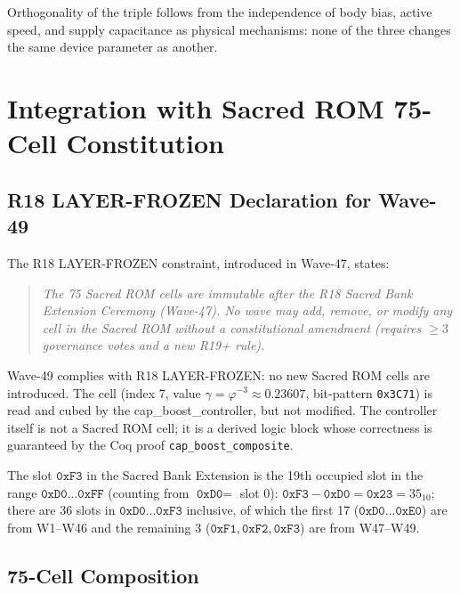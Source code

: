 \documentclass[12pt,a4paper]{report}
\theoremstyle{plain}
\theoremstyle{definition}
\theoremstyle{remark}
\newcommand{\Bseven}{\mathrm{B007}}
\begin{document}
Orthogonality of the triple follows from the independence of body bias,
active speed, and supply capacitance as physical mechanisms:
none of the three changes the same device parameter as another.

\section{Integration with Sacred ROM 75-Cell Constitution}
\label{sec:sacred-rom-integration}

\subsection{R18 LAYER-FROZEN Declaration for Wave-49}
\label{ssec:r18-declaration}

The R18 LAYER-FROZEN constraint, introduced in Wave-47, states:
\begin{quote}
  \itshape
  The 75 Sacred ROM cells are immutable after the R18 Sacred Bank
  Extension Ceremony (Wave-47).  No wave may add, remove, or modify
  any cell in the Sacred ROM without a constitutional amendment
  (requires $\geq 3$ governance votes and a new R19+ rule).
\end{quote}

Wave-49 complies with R18 LAYER-FROZEN: no new Sacred ROM cells are
introduced.
The \Bseven{} cell (index 7, value $\gamma = \varphi^{-3} \approx 0.23607$,
bit-pattern \texttt{0x3C71}) is read and cubed by the cap\_boost\_controller,
but not modified.
The controller itself is not a Sacred ROM cell; it is a derived logic block
whose correctness is guaranteed by the Coq proof \texttt{cap\_boost\_composite}.

The slot $\texttt{0xF3}$ in the Sacred Bank Extension is the 19th occupied
slot in the range $\texttt{0xD0}\ldots\texttt{0xFF}$ (counting from
$\texttt{0xD0} = $ slot 0):
$\texttt{0xF3} - \texttt{0xD0} = \texttt{0x23} = 35_{10}$; there are 36 slots
in $\texttt{0xD0}\ldots\texttt{0xF3}$ inclusive, of which the first
17 ($\texttt{0xD0}\ldots\texttt{0xE0}$) are from W1--W46 and the remaining
3 ($\texttt{0xF1}, \texttt{0xF2}, \texttt{0xF3}$) are from W47--W49.

\subsection{75-Cell Composition}
\label{ssec:75-cell-composition}
\end{document}
